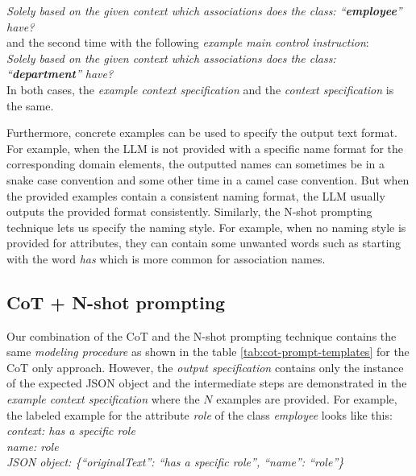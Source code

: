 \noindent{}\textit{Solely based on the given context which associations does the class: ``\textbf{employee}'' have?} \\

\noindent{}and the second time with the following \emph{example main control instruction}: \\

\noindent{}\textit{Solely based on the given context which associations does the class: ``\textbf{department}'' have?} \\

\noindent{}In both cases, the \emph{example context specification} and the \emph{context specification} is the same.

Furthermore, concrete examples can be used to specify the output text format. For example, when the LLM is not provided with a specific name format for the corresponding domain elements, the outputted names can sometimes be in a snake case convention and some other time in a camel case convention. But when the provided examples contain a consistent naming format, the LLM usually outputs the provided format consistently. Similarly, the N-shot prompting technique lets us specify the naming style. For example, when no naming style is provided for attributes, they can contain some unwanted words such as starting with the word \textit{has} which is more common for association names.


\subsection{CoT + N-shot prompting}

Our combination of the CoT and the N-shot prompting technique contains the same \emph{modeling procedure} as shown in the table \ref{tab:cot-prompt-templates} for the CoT only approach. However, the \emph{output specification} contains only the instance of the expected JSON object and the intermediate steps are demonstrated in the \emph{example context specification} where the $N$ examples are provided. For example, the labeled example for the attribute \textit{role} of the class \textit{employee} looks like this: \\

\noindent{}\textit{context: has a specific role} \\
\textit{name: role} \\
\textit{JSON object: \{``originalText'': ``has a specific role'', ``name'': ``role''\}} \\

